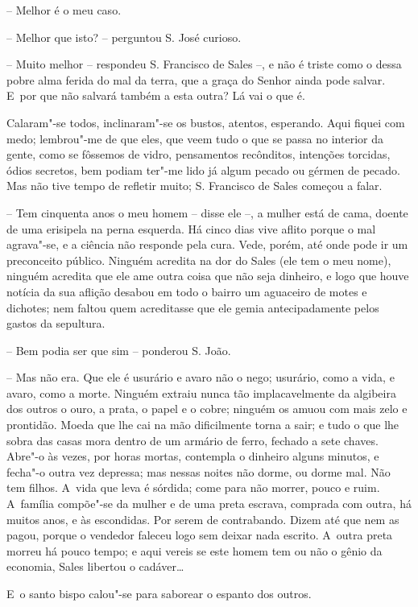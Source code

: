 -- Melhor é o meu caso.

-- Melhor que isto? -- perguntou S. José curioso.

-- Muito melhor -- respondeu S. Francisco de Sales --, e não é triste
como o dessa pobre alma ferida do mal da terra, que a graça do Senhor
ainda pode salvar. E~por que não salvará também a esta outra? Lá vai o
que é.

Calaram"-se todos, inclinaram"-se os bustos, atentos, esperando. Aqui
fiquei com medo; lembrou"-me de que eles, que veem tudo o que se passa no
interior da gente, como se fôssemos de vidro, pensamentos recônditos,
intenções torcidas, ódios secretos, bem podiam ter"-me lido já algum
pecado ou gérmen de pecado. Mas não tive tempo de refletir muito; S.
Francisco de Sales começou a falar.

-- Tem cinquenta anos o meu homem -- disse ele --, a mulher está de
cama, doente de uma erisipela na perna esquerda. Há cinco dias vive
aflito porque o mal agrava"-se, e a ciência não responde pela cura. Vede,
porém, até onde pode ir um preconceito público. Ninguém acredita na dor
do Sales (ele tem o meu nome), ninguém acredita que ele ame outra coisa
que não seja dinheiro, e logo que houve notícia da sua aflição desabou
em todo o bairro um aguaceiro de motes e dichotes; nem faltou quem
acreditasse que ele gemia antecipadamente pelos gastos da sepultura.

-- Bem podia ser que sim -- ponderou S. João.

-- Mas não era. Que ele é usurário e avaro não o nego; usurário, como a
vida, e avaro, como a morte. Ninguém extraiu nunca tão implacavelmente
da algibeira dos outros o ouro, a prata, o papel e o cobre; ninguém os
amuou com mais zelo e prontidão. Moeda que lhe cai na mão dificilmente
torna a sair; e tudo o que lhe sobra das casas mora dentro de um armário
de ferro, fechado a sete chaves. Abre"-o às vezes, por horas mortas,
contempla o dinheiro alguns minutos, e fecha"-o outra vez depressa; mas
nessas noites não dorme, ou dorme mal. Não tem filhos. A~vida que leva é
sórdida; come para não morrer, pouco e ruim. A~família compõe"-se da
mulher e de uma preta escrava, comprada com outra, há muitos anos, e às
escondidas. Por serem de contrabando. Dizem até que nem as pagou, porque
o vendedor faleceu logo sem deixar nada escrito. A~outra preta morreu há
pouco tempo; e aqui vereis se este homem tem ou não o gênio da economia,
Sales libertou o cadáver\ldots{}

E~o santo bispo calou"-se para saborear o espanto dos outros.

